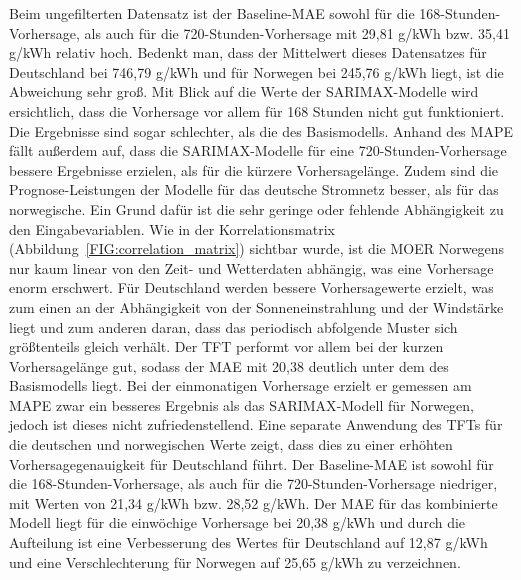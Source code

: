 \noindent Beim ungefilterten Datensatz ist der Baseline-\ac{MAE} sowohl für die 168-Stunden-Vorhersage, als auch für die 720-Stunden-Vorhersage mit 29,81 g/\ac{kWh} bzw. 35,41 g/\ac{kWh} relativ hoch.
Bedenkt man, dass der Mittelwert dieses Datensatzes für Deutschland bei 746,79 g/\ac{kWh} und für Norwegen bei 245,76 g/\ac{kWh} liegt, ist die Abweichung sehr groß.
Mit Blick auf die Werte der \ac{SARIMAX}-Modelle wird ersichtlich, dass die Vorhersage vor allem für 168 Stunden nicht gut funktioniert.
Die Ergebnisse sind sogar schlechter, als die des Basismodells.
Anhand des \ac{MAPE} fällt außerdem auf, dass die \ac{SARIMAX}-Modelle für eine 720-Stunden-Vorhersage bessere Ergebnisse erzielen, als für die kürzere Vorhersagelänge.
Zudem sind die Prognose-Leistungen der Modelle für das deutsche Stromnetz besser, als für das norwegische.
Ein Grund dafür ist die sehr geringe oder fehlende Abhängigkeit zu den Eingabevariablen.
Wie in der Korrelationsmatrix (Abbildung~\ref{FIG:correlation_matrix}) sichtbar wurde, ist die \ac{MOER} Norwegens nur kaum linear von den Zeit- und Wetterdaten abhängig, was eine Vorhersage enorm erschwert.
Für Deutschland werden bessere Vorhersagewerte erzielt, was zum einen an der Abhängigkeit von der Sonneneinstrahlung und der Windstärke liegt und zum anderen daran, dass das periodisch abfolgende Muster sich größtenteils gleich verhält.
Der \ac{TFT} performt vor allem bei der kurzen Vorhersagelänge gut, sodass der \ac{MAE} mit 20,38 deutlich unter dem des Basismodells liegt.
Bei der einmonatigen Vorhersage erzielt er gemessen am \ac{MAPE} zwar ein besseres Ergebnis als das \ac{SARIMAX}-Modell für Norwegen, jedoch ist dieses nicht zufriedenstellend.
Eine separate Anwendung des \acp{TFT} für die deutschen und norwegischen Werte zeigt, dass dies zu einer erhöhten Vorhersagegenauigkeit für Deutschland führt.
Der Baseline-\ac{MAE} ist sowohl für die 168-Stunden-Vorhersage, als auch für die 720-Stunden-Vorhersage niedriger, mit Werten von 21,34 g/\ac{kWh} bzw. 28,52 g/\ac{kWh}.
Der \ac{MAE} für das kombinierte Modell liegt für die einwöchige Vorhersage bei 20,38 g/\ac{kWh} und durch die Aufteilung ist eine Verbesserung des Wertes für Deutschland auf 12,87 g/\ac{kWh} und eine Verschlechterung für Norwegen auf 25,65 g/\ac{kWh} zu verzeichnen.

